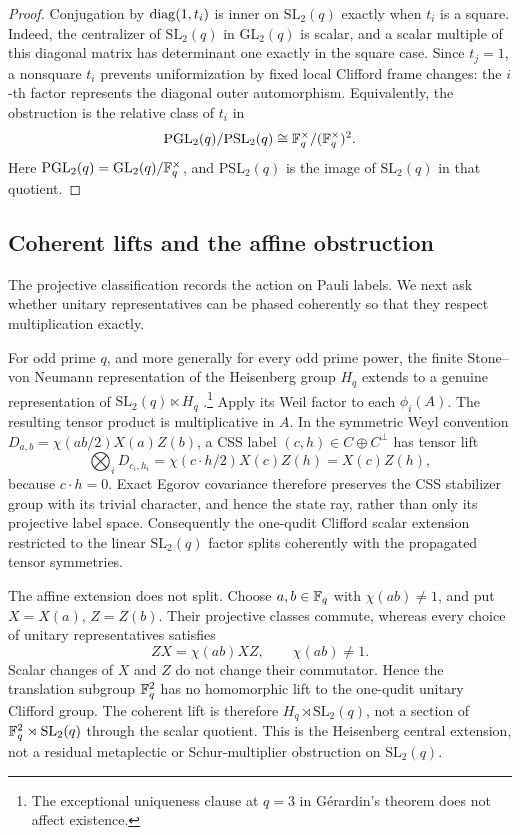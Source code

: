 \begin{proof}
Conjugation by \(\operatorname{diag}(1,t_i)\) is inner on \(\mathrm{SL}_2(q)\) exactly
when \(t_i\) is a square.  Indeed, the centralizer of
\(\mathrm{SL}_2(q)\) in \(\mathrm{GL}_2(q)\) is scalar, and a scalar
multiple of this diagonal matrix has determinant one exactly in the square
case.  Since \(t_j=1\), a nonsquare \(t_i\) prevents uniformization by fixed
local Clifford frame changes: the \(i\)-th factor represents the diagonal
outer automorphism.  Equivalently, the obstruction is the relative class of
\(t_i\) in
\[
 \mathrm{PGL}_2(q)/\mathrm{PSL}_2(q)
 \cong\mathbb F_q^\times/(\mathbb F_q^\times)^2.
\]
Here \(\mathrm{PGL}_2(q)=\mathrm{GL}_2(q)/\mathbb F_q^\times\), and
\(\mathrm{PSL}_2(q)\) is the image of \(\mathrm{SL}_2(q)\) in that quotient.
\end{proof}

\subsection{Coherent lifts and the affine obstruction}

The projective classification records the action on Pauli labels.  We next
ask whether unitary representatives can be phased coherently so that they
respect multiplication exactly.

For odd prime \(q\), and more generally for every odd prime power, the finite
Stone--von Neumann representation of the Heisenberg group \(H_q\) extends to
a genuine representation of \(\mathrm{SL}_2(q)\ltimes H_q\)
\cite[Theorem~1]{Gerardin1976}.\footnote{The exceptional uniqueness clause at
\(q=3\) in G\'erardin's theorem does not affect existence.}  Apply its Weil
factor to each \(\phi_i(A)\).  The resulting tensor product is
multiplicative in \(A\).  In the symmetric Weyl convention
\(D_{a,b}=\chi(ab/2)X(a)Z(b)\), a CSS label
\((c,h)\in C\oplus C^\perp\) has tensor lift
\[
 \bigotimes_iD_{c_i,h_i}
 =\chi(c\mathbin{\cdot}h/2)X(c)Z(h)=X(c)Z(h),
\]
because \(c\mathbin{\cdot}h=0\).  Exact Egorov covariance therefore
preserves the CSS stabilizer group with its trivial character, and hence the
state ray, rather than only its projective label space.  Consequently the
one-qudit Clifford scalar extension restricted to the linear
\(\mathrm{SL}_2(q)\) factor splits coherently with the propagated tensor
symmetries.

The affine extension does not split.  Choose \(a,b\in\mathbb F_q\) with
\(\chi(ab)\ne1\), and put \(X=X(a)\), \(Z=Z(b)\).  Their projective classes
commute, whereas every choice of unitary representatives satisfies
\[
 ZX=\chi(ab)XZ,\qquad \chi(ab)\ne1 .
\]
Scalar changes of \(X\) and \(Z\) do not change their commutator.  Hence the
translation subgroup \(\mathbb F_q^2\) has no homomorphic lift to the one-qudit
unitary Clifford group.  The coherent lift is therefore
\(H_q\rtimes\mathrm{SL}_2(q)\), not a section of
\(\mathbb F_q^2\rtimes\mathrm{SL}_2(q)\) through the scalar quotient.  This is the
Heisenberg central extension, not a residual metaplectic or Schur-multiplier
obstruction on \(\mathrm{SL}_2(q)\).

